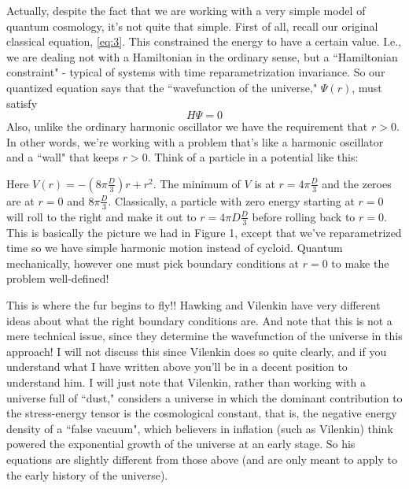 Actually, despite the fact that we are working with a very simple model of quantum cosmology, it's not quite that simple. First of all, recall our original classical equation, \eqref{eq:3}. This constrained the energy to have a certain value. I.e., we are dealing not with a Hamiltonian in the ordinary sense, but a ``Hamiltonian constraint" - typical of systems with time reparametrization invariance. So our quantized equation says that the ``wavefunction of the universe," $\Psi(r)$, must satisfy
\[H\Psi = 0\]
Also, unlike the ordinary harmonic oscillator we have the requirement that $r > 0$. In other words, we're working with a problem that's like a harmonic oscillator and a ``wall" that keeps $r > 0$. Think of a particle in a potential like this:
%
%

Here $V(r) = - (8\pi \frac{D}{3})r + r^2$. The minimum of $V$ is at $r = 4\pi \frac{D}{3}$ and the zeroes are at $r = 0$ and $8\pi \frac{D}{3}$. Classically, a particle with zero energy starting at $r = 0$ will roll to the right and make it out to $r = 4\pi D\frac{D}{3}$ before rolling back to $r = 0$. This is basically the picture we had in Figure 1, except that we've reparametrized time so we have simple harmonic motion instead of cycloid.
Quantum mechanically, however one must pick boundary conditions at $r = 0$ to make the problem well-defined!

This is where the fur begins to fly!! Hawking and Vilenkin have very different ideas about what the right boundary conditions are. And note that this is not a mere technical issue, since they determine the wavefunction of the universe in this approach! I will not discuss this since Vilenkin does so quite clearly, and if you understand what I have written above you'll be in a decent position to understand him. I will just note that Vilenkin, rather than working with a universe full of ``dust," considers a universe in which the dominant contribution to the stress-energy tensor is the cosmological constant, that is, the negative energy density of a ``false vacuum", which believers in inflation (such as Vilenkin) think powered the exponential growth of the universe at an early stage. So his equations are slightly different from those above (and are only meant to apply to the early history of the universe).

